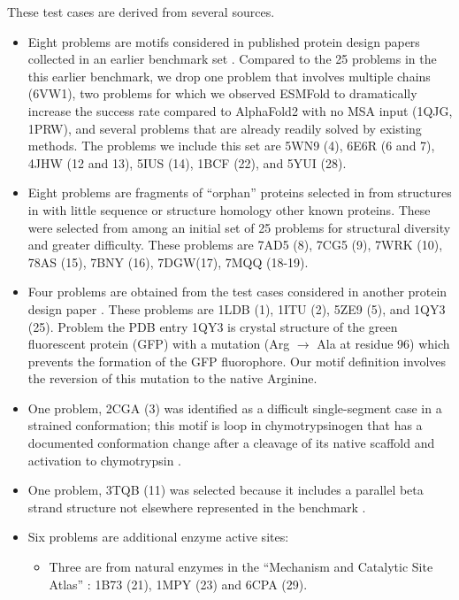 These test cases are derived from several sources.
\begin{itemize}
    \item{Eight problems are motifs considered in published protein design papers collected in an earlier benchmark set \citep[Table S9 of ][]{watson2022broadly}. Compared to the 25 problems in the this earlier benchmark, we drop one problem that involves multiple chains (6VW1), two problems for which we observed ESMFold to dramatically increase the success rate compared to AlphaFold2 with no MSA input (1QJG, 1PRW), and several problems that are already readily solved by existing methods.  The problems we include this set are 5WN9 (4), 6E6R (6 and 7), 4JHW (12 and 13), 5IUS (14), 1BCF (22), and 5YUI (28).}
\item Eight problems are fragments of ``orphan'' proteins selected in \citep[Table S11 of ][]{watson2022broadly} from structures in \citep{wu2022omegafold} with little sequence or structure homology other known proteins.  These were selected from among an initial set of 25 problems for structural diversity and greater difficulty.  These problems are 7AD5 (8), 7CG5 (9), 7WRK (10), 78AS (15), 7BNY (16), 7DGW(17), 7MQQ (18-19).
\item{Four problems are obtained from the test cases considered in another protein design paper \citep{hayes2024simulating}.  These problems are 1LDB (1), 1ITU (2), 5ZE9 (5), and 1QY3 (25).  Problem the PDB entry 1QY3 is crystal structure of the green fluorescent protein (GFP) with a mutation (Arg $\rightarrow$ Ala at residue 96) which prevents the formation of the GFP fluorophore.  Our motif definition involves the reversion of this mutation to the native Arginine.}
\item{One problem, 2CGA (3) was identified as a difficult single-segment case in a strained conformation; this motif is loop in chymotrypsinogen that has a documented conformation change after a cleavage of its native scaffold and activation to chymotrypsin \citep{wang1985bovine}.}
\item{One problem, 3TQB (11) was selected because it includes a parallel beta strand structure not elsewhere represented in the benchmark \citep{tkaczuk2013structural}.}
\item{Six problems are additional enzyme active sites: 
\begin{itemize}
    \item{Three are from natural enzymes in the ``Mechanism and Catalytic Site Atlas'' \citep{ribeiro2018mechanism}: 1B73 (21), 1MPY (23) and 6CPA (29). }

\end{itemize}}
\end{itemize}
